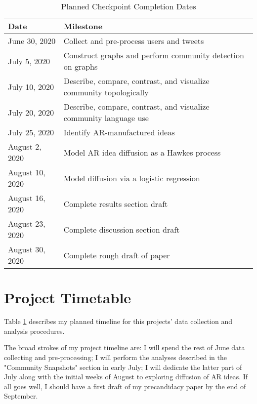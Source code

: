 \documentclass[acmlarge, screen, authorversion]{acmart}
\begin{document}
\begin{table}[htbp!]

	\caption{Planned Checkpoint Completion Dates}
	\label{table:timetable}

	\begin{tabular}{ l l  }

		\toprule
		Date               & Milestone                                                          \\
		\midrule
		June 30, 2020      & Collect and pre-process users and tweets                           \\
		\hline
		July 5, 2020       & Construct graphs and perform community detection on graphs         \\
		\hline
		July 10, 2020      & Describe, compare, contrast, and visualize community topologically \\
		\hline
		July 20, 2020      & Describe, compare, contrast, and visualize community language use  \\
		\hline
		July 25, 2020      & Identify AR-manufactured ideas                                     \\
		\hline
		August 2, 2020     & Model AR idea diffusion as a Hawkes process                        \\
		\hline
		August 10, 2020    & Model diffusion via a logistic regression                  \\
		\hline
		August 16, 2020    & Complete results section draft                                     \\
		\hline
		August 23, 2020    & Complete discussion section draft                                   \\
		\hline
		August 30, 2020 & Complete rough draft of paper                                         \\
		\bottomrule
	\end{tabular}
\end{table}

\section{Project Timetable}

Table \ref{table:timetable} describes my planned timeline for this projects' data collection and analysis procedures.

The broad strokes of my project timeline are: I will spend the rest of June data collecting and pre-processing; I will perform the analyses described in the "Community Snapshots" section in early July; I will dedicate the latter part of July along with the initial weeks of August to exploring diffusion of AR ideas. If all goes well, I should have a first draft of my precandidacy paper by the end of September.

\clearpage


\end{document}
